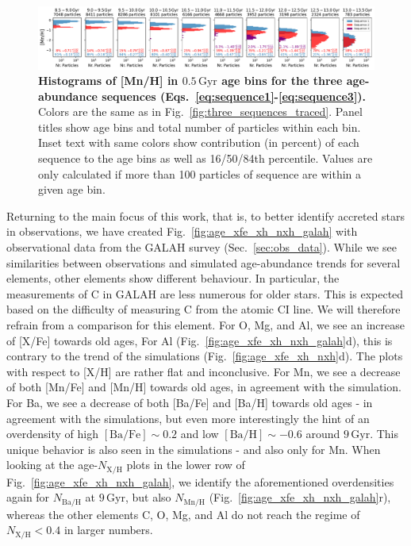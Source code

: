 \documentclass[fleqn,usenatbib]{mnras}
\begin{document}
\begin{figure}
	\includegraphics[width=\textwidth]{figures/histograms_xh_in_age_bins_Mn.pdf}
    \caption{
    \textbf{Histograms of {[Mn/H]} in $0.5\,\mathrm{Gyr}$ age bins for the three age-abundance sequences (Eqs.~\ref{eq:sequence1}-\ref{eq:sequence3}).} Colors are the same as in Fig.~\ref{fig:three_sequences_traced}. Panel titles show age bins and total number of particles within each bin. Inset text with same colors show contribution (in percent) of each sequence to the age bins as well as 16/50/84th percentile. Values are only calculated if more than 100 particles of sequence are within a given age bin.
    }
    \label{fig:histograms_xh_in_age_bins_Mn}
\end{figure}

Returning to the main focus of this work, that is, to better identify accreted stars in observations, we have created Fig.~\ref{fig:age_xfe_xh_nxh_galah} with observational data from the GALAH survey (Sec.~\ref{sec:obs_data}). While we see similarities between observations and simulated age-abundance trends for several elements, other elements show different behaviour. In particular, the measurements of C in GALAH are less numerous for older stars. This is expected based on the difficulty of measuring C from the atomic CI line. We will therefore refrain from a comparison for this element. For O, Mg, and Al, we see an increase of [X/Fe] towards old ages, For Al (Fig.~\ref{fig:age_xfe_xh_nxh_galah}d), this is contrary to the trend of the simulations (Fig.~\ref{fig:age_xfe_xh_nxh}d). The plots with respect to [X/H] are rather flat and inconclusive. For Mn, we see a decrease of both [Mn/Fe] and [Mn/H] towards old ages, in agreement with the simulation. For Ba, we see a decrease of both [Ba/Fe] and [Ba/H] towards old ages - in agreement with the simulations, but even more interestingly the hint of an overdensity of high $\mathrm{[Ba/Fe]} \sim 0.2$ and low $\mathrm{[Ba/H]} \sim -0.6$ around $9\,\mathrm{Gyr}$. This unique behavior is also seen in the simulations - and also only for Mn. When looking at the age-$N_\mathrm{X/H}$ plots in the lower row of Fig.~\ref{fig:age_xfe_xh_nxh_galah}, we identify the aforementioned overdensities again for $N_\mathrm{Ba/H}$ at $9\,\mathrm{Gyr}$, but also $N_\mathrm{Mn/H}$ (Fig.~\ref{fig:age_xfe_xh_nxh_galah}r), whereas the other elements C, O, Mg, and Al do not reach the regime of $N_\mathrm{X/H} < 0.4$ in larger numbers.
\end{document}
